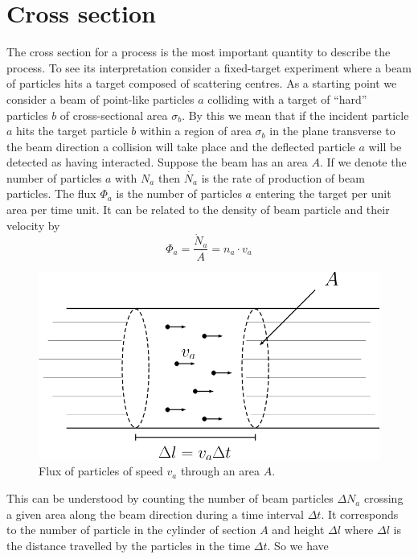 \documentclass[12pt]{article}
\begin{document}
\section{Cross section}
The cross section for a process is the most important quantity to describe the process. To see its interpretation consider a fixed-target experiment where a beam of particles hits a target composed of scattering centres.
As a starting point we consider a beam of point-like particles $a$ colliding with a target of ``hard'' particles $b$ of cross-sectional area $\sigma_b$. By this we mean that if the incident particle $a$ hits the target particle $b$ within a region of area $\sigma_b$ in the plane transverse to the beam direction a collision will take place and the deflected particle $a$ will be detected as having interacted. Suppose the beam has an area $A$. If we denote the number of particles $a$ with $N_a$ then $\dot{N_a}$ is the rate of production of beam particles. The flux $\Phi_a$ is the number of particles $a$ entering the target per unit area per time unit. It can be related to the density of beam particle and their velocity by
\[\Phi_a=\frac{\dot N_a}{A}=n_a\cdot v_a\]
\begin{figure}
\begin{center} 
\includegraphics[scale=0.3]{images/beam.png}
\end{center}
\caption{Flux of particles of speed $v_a$ through an area $A$.}\label{fig:flux}
\end{figure}
This can be understood by counting the number of beam particles $\Delta N_a$ crossing a given area along the beam direction during a time interval $\Delta t$. It corresponds to the number of particle in the cylinder of section $A$ and height $\Delta l$ where $\Delta l$ is the distance travelled by the particles in the time $\Delta t$. So we have
\end{document}
